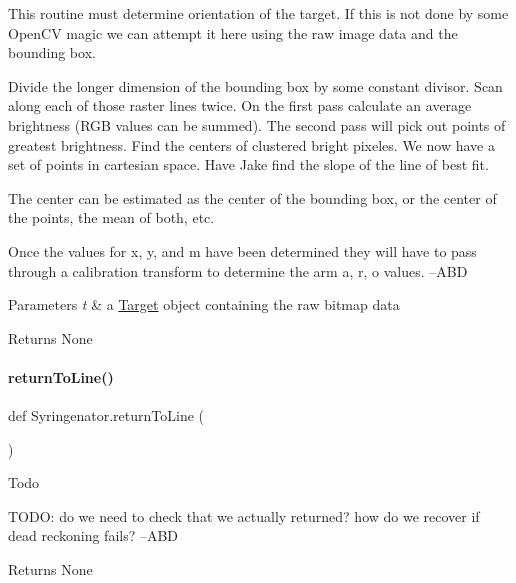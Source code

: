 This routine must determine orientation of the target. If this is not done by some Open\+CV magic we can attempt it here using the raw image data and the bounding box.

Divide the longer dimension of the bounding box by some constant divisor. Scan along each of those raster lines twice. On the first pass calculate an average brightness (R\+GB values can be summed). The second pass will pick out points of greatest brightness. Find the centers of clustered bright pixeles. We now have a set of points in cartesian space. Have Jake find the slope of the line of best fit.

The center can be estimated as the center of the bounding box, or the center of the points, the mean of both, etc.

Once the values for x, y, and m have been determined they will have to pass through a calibration transform to determine the arm a, r, o values. --A\+BD


\begin{DoxyParams}{Parameters}
{\em t} & a \mbox{\hyperlink{classSyringenator_1_1Target}{Target}} object containing the raw bitmap data \\
\hline
\end{DoxyParams}
\begin{DoxyReturn}{Returns}
None 
\end{DoxyReturn}
\mbox{\label{namespaceSyringenator_afe04905c8a4a9d077457422866633203}} 
\paragraph{\texorpdfstring{returnToLine()}{returnToLine()}}
{\footnotesize\ttfamily def Syringenator.\+return\+To\+Line (\begin{DoxyParamCaption}{ }\end{DoxyParamCaption})}

\begin{DoxyRefDesc}{Todo}
\item[\mbox{\hyperlink{todo__todo000002}{Todo}}]T\+O\+DO\+: do we need to check that we actually returned? how do we recover if dead reckoning fails? --A\+BD \end{DoxyRefDesc}
\begin{DoxyReturn}{Returns}
None 
\end{DoxyReturn}
\mbox{\label{namespaceSyringenator_aff01237d3ff3e33f0ffc32927d813df0}} 
